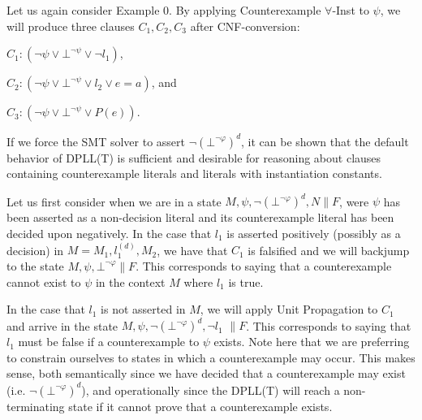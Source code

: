 \documentclass{llncs}
\begin{document}
Let us again consider Example 0.
By applying Counterexample $\forall$-Inst to $\psi$, we will produce three clauses $C_1, C_2, C_3$ after CNF-conversion:

$C_1 : ( \neg \psi \vee \bot^{\neg \psi} \vee \neg l_1 )$,

$C_2 : ( \neg \psi \vee \bot^{\neg \psi} \vee l_2 \vee e = a )$, and

$C_3 : ( \neg \psi \vee \bot^{\neg \psi} \vee P( e ) )$.

If we force the SMT solver to assert $\neg( \bot^{\neg \varphi} )^d$, it can be shown that the default behavior of DPLL(T) is sufficient and desirable for reasoning about clauses containing counterexample literals and literals with instantiation constants.

Let us first consider when we are in a state $M, \psi, \neg( \bot^{\neg \varphi} )^d, N \parallel F$, were $\psi$ has been asserted as a non-decision literal and its counterexample literal has been decided upon negatively.
In the case that $l_1$ is asserted positively (possibly as a decision) in $M = M_1, l^{(d)}_1, M_2$, we have that $C_1$ is falsified and we will backjump to the state $M, \psi, \bot^{\neg \varphi} \parallel F$.
This corresponds to saying that a counterexample cannot exist to $\psi$ in the context $M$ where $l_1$ is true.

In the case that $l_1$ is not asserted in $M$, we will apply Unit Propagation to $C_1$ and arrive in the state $M, \psi, \neg( \bot^{\neg \varphi} )^d, \neg l_1$ $\parallel F$.
This corresponds to saying that $l_1$ must be false if a counterexample to $\psi$ exists.
Note here that we are preferring to constrain ourselves to states in which a counterexample may occur.
This makes sense, both semantically since we have decided that a counterexample may exist (i.e. $\neg( \bot^{\neg \varphi} )^d$), and operationally since the DPLL(T) will reach a non-terminating state if it cannot prove that a counterexample exists.

\end{document}
